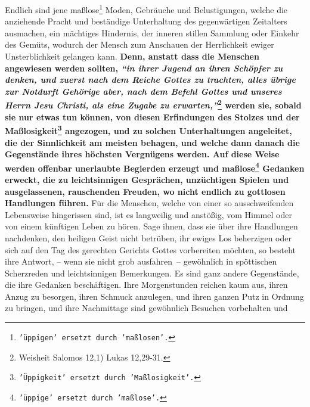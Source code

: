 Endlich sind jene
maßlose\footnote{\texttt{'üppigen' ersetzt durch 'maßlosen'.}} Moden, Gebräuche
und Belustigungen, welche die
anziehende Pracht und beständige Unterhaltung des gegenwärtigen Zeitalters
ausmachen, ein mächtiges Hindernis, der inneren stillen
Sammlung oder Einkehr des
Gemüts, wodurch der Mensch zum Anschauen der Herrlichkeit ewiger
Unsterblichkeit gelangen kann.
\label{ref:17_01_erziehung}
\textbf{Denn, anstatt dass die Menschen angewiesen werden
sollten,
\textit{"`in ihrer Jugend an ihren Schöpfer zu denken, und zuerst nach dem
Reiche Gottes zu trachten, alles übrige zur Notdurft
Gehörige aber, nach dem
Befehl Gottes und unseres Herrn Jesu Christi, als eine Zugabe zu
erwarten,"'}\footnote{Weisheit Salomos 12,1) Lukas 12,29-31.}
werden sie, sobald sie nur
etwas tun können, von diesen Erfindungen des Stolzes und der
Maßlosigkeit\footnote{\texttt{'Üppigkeit' ersetzt durch 'Maßlosigkeit'.}}
angezogen, und zu solchen Unterhaltungen angeleitet, die der Sinnlichkeit am
meisten behagen, und welche dann danach die Gegenstände ihres höchsten
Vergnügens werden. Auf diese Weise werden offenbar unerlaubte Begierden erzeugt
und maßlose\footnote{\texttt{'üppige' ersetzt durch 'maßlose'.}} Gedanken
erweckt, die zu
leichtsinnigen Gesprächen, unzüchtigen
Spielen und ausgelassenen, rauschenden Freuden, wo nicht endlich zu gottlosen
Handlungen führen.} Für die Menschen, welche von einer so ausschweifenden
Lebensweise hingerissen sind, ist es langweilig und anstößig, vom Himmel oder
von einem künftigen Leben zu hören. Sage ihnen, dass sie über ihre Handlungen
nachdenken, den heiligen Geist nicht betrüben, ihr ewiges
Los beherzigen oder
sich auf den Tag des gerechten Gerichts Gottes
vorbereiten möchten, so besteht
ihre Antwort, -- wenn sie nicht grob ausfahren~-- gewöhnlich in spöttischen
Scherzreden und leichtsinnigen Bemerkungen. Es sind ganz andere Gegenstände, die
ihre Gedanken beschäftigen. Ihre Morgenstunden reichen kaum aus, ihren Anzug zu
besorgen, ihren Schmuck anzulegen, und ihren ganzen Putz in Ordnung zu bringen,
und ihre Nachmittage sind gewöhnlich Besuchen vorbehalten und
\label{ref:17_01_schauspiel}

